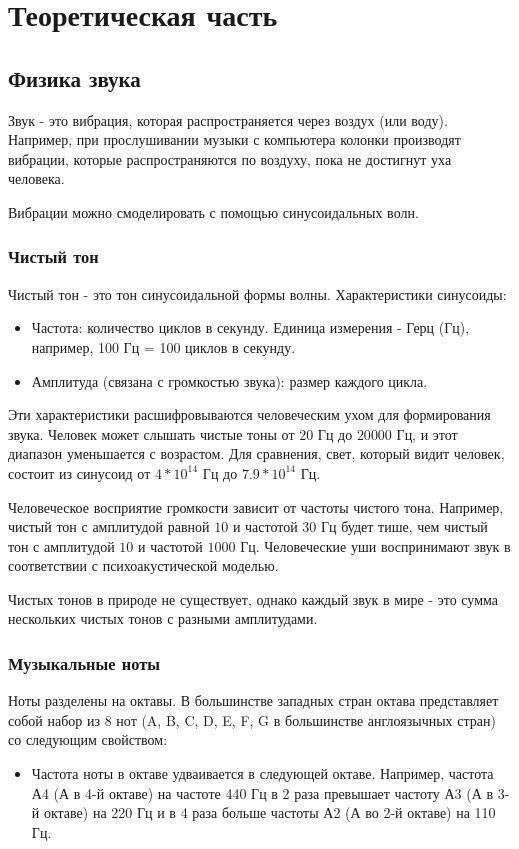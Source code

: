 \chapter{Теоретическая часть}
\label{cha:ch_1}

\section{Физика звука}
Звук - это вибрация, которая распространяется через воздух (или воду).
Например, при прослушивании музыки с компьютера колонки производят вибрации,
которые распространяются по воздуху, пока не достигнут уха человека.

Вибрации можно смоделировать с помощью синусоидальных волн.

\subsection{Чистый тон}
Чистый тон - это тон синусоидальной формы волны. Характеристики синусоиды:
\begin{itemize}
    \item Частота: количество циклов в секунду. Единица измерения - Герц (Гц), например, 100 Гц = 100 циклов в секунду.
    \item Амплитуда (связана с громкостью звука): размер каждого цикла.
\end{itemize}

Эти характеристики расшифровываются человеческим ухом для формирования звука.
Человек может слышать чистые тоны от $20$ Гц до $20 000$ Гц,
и этот диапазон уменьшается с возрастом. Для сравнения, свет, который видит человек,
состоит из синусоид от $4 * 10^{14}$ Гц до $7.9 * 10^{14}$ Гц.

Человеческое восприятие громкости зависит от частоты чистого тона.
Например, чистый тон с амплитудой равной $10$ и частотой $30$ Гц будет тише,
чем чистый тон с амплитудой $10$ и частотой $1000$ Гц.
Человеческие уши воспринимают звук в соответствии с психоакустической моделью.

Чистых тонов в природе не существует, однако каждый звук в мире - это сумма
нескольких чистых тонов с разными амплитудами.

\subsection{Музыкальные ноты}
Ноты разделены на октавы. В большинстве западных стран октава представляет
собой набор из 8 нот (A, B, C, D, E, F, G в большинстве англоязычных
стран) со следующим свойством:
\begin{itemize}
    \item Частота ноты в октаве удваивается в следующей октаве.
    Например, частота А4 (А в 4-й октаве) на частоте 440 Гц в 2 раза
    превышает частоту А3 (А в 3-й октаве) на 220 Гц и в 4 раза больше
    частоты А2 (А во 2-й октаве) на 110 Гц.
\end{itemize}

